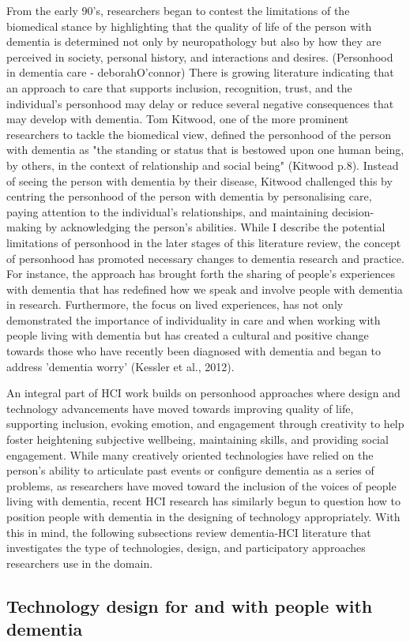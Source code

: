 From the early 90's, researchers began to contest the limitations of the biomedical stance by highlighting that the quality of life of the person with dementia is determined not only by neuropathology but also by how they are perceived in society, personal history, and interactions and desires. (Personhood in dementia care - deborahO'connor) There is growing literature indicating that an approach to care that supports inclusion, recognition, trust, and the individual's personhood may delay or reduce several negative consequences that may develop with dementia. Tom Kitwood, one of the more prominent researchers to tackle the biomedical view, defined the personhood of the person with dementia as "the standing or status that is bestowed upon one human being, by others, in the context of relationship and social being" (Kitwood p.8). Instead of seeing the person with dementia by their disease, Kitwood challenged this by centring the personhood of the person with dementia by personalising care, paying attention to the individual's relationships, and maintaining decision-making by acknowledging the person's abilities.    While I describe the potential limitations of personhood in the later stages of this literature review, the concept of personhood has promoted necessary changes to dementia research and practice. For instance, the approach has brought forth the sharing of people's experiences with dementia that has redefined how we speak and involve people with dementia in research. Furthermore, the focus on lived experiences, has not only demonstrated the importance of individuality in care and when working with people living with dementia but has created a cultural and positive change towards those who have recently been diagnosed with dementia and began to address 'dementia worry' (Kessler et al., 2012).

An integral part of HCI work builds on personhood approaches where design and technology advancements have moved towards improving quality of life, supporting inclusion, evoking emotion, and engagement through creativity to help foster heightening subjective wellbeing, maintaining skills, and providing social engagement. While many creatively oriented technologies have relied on the person's ability to articulate past events or configure dementia as a series of problems, as researchers have moved toward the inclusion of the voices of people living with dementia, recent HCI research has similarly begun to question how to position people with dementia in the designing of technology appropriately. With this in mind, the following subsections review dementia-HCI literature that investigates the type of technologies, design, and participatory approaches researchers use in the domain.

\subsection{Technology design for and with people with dementia}
\label{BL:Tech}



